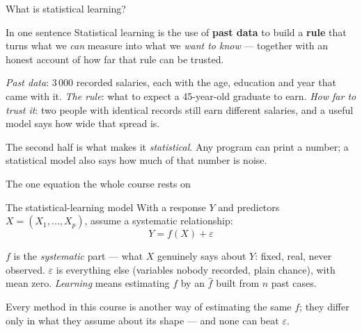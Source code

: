 \documentclass[aspectratio=169,11pt]{beamer}
\begin{document}
\begin{frame}{What is statistical learning?}
  \begin{block}{In one sentence}
    Statistical learning is the use of \textbf{past data} to build a \textbf{rule} that turns
    what we \emph{can} measure into what we \emph{want to know} --- together with an honest
    account of how far that rule can be trusted.
  \end{block}
  \begin{readme}
    \emph{Past data}: $3\,000$ recorded salaries, each with the age, education and year that
    came with it. \emph{The rule}: what to expect a 45-year-old graduate to earn.
    \emph{How far to trust it}: two people with identical records still earn different
    salaries, and a useful model says how wide that spread is.
  \end{readme}
  \begin{takeaway}The second half is what makes it \emph{statistical}. Any program can print a number; a statistical model also says how much of that number is noise.\end{takeaway}
\end{frame}

\begin{frame}{The one equation the whole course rests on}
  \begin{block}{The statistical-learning model}
    \setlength{\abovedisplayskip}{3pt}\setlength{\belowdisplayskip}{1pt}
    With a response $Y$ and predictors $X=(X_1,\dots,X_p)$, assume a systematic relationship:
    \[ \boxed{\;Y=f(X)+\varepsilon\;} \]
  \end{block}
  \begin{readme}
    $f$ is the \emph{systematic} part --- what $X$ genuinely says about $Y$: fixed, real, never
    observed. $\varepsilon$ is everything else (variables nobody recorded, plain chance), with
    mean zero. \emph{Learning} means estimating $f$ by an $\hat f$ built from $n$ past cases.
  \end{readme}
  \begin{takeaway}Every method in this course is another way of estimating the same $f$; they differ only in what they assume about its shape --- and none can beat $\varepsilon$.\end{takeaway}
\end{frame}
\end{document}
